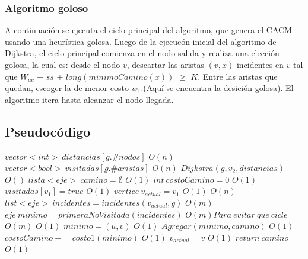 \subsubsection{Algoritmo goloso}

A continuaci\'on se ejecuta el ciclo principal del algoritmo, que genera el CACM usando una heur\'istica golosa. Luego de la ejecuc\'on inicial del algoritmo de Dijkstra, el ciclo principal comienza en el nodo salida y realiza una elecci\'on golosa, la cual es: desde el nodo $v$, descartar las aristas $(v,x)$ incidentes en $v$ tal que $W_{ac}$ + $ss$ + $long(minimoCamino(x))$ $\geq$ $K$. Entre las aristas que quedan, escoger la de menor costo $w_1$.(Aqu\'i se encuentra la desici\'on golosa). El algoritmo itera hasta alcanzar el nodo llegada.

\subsection{Pseudoc\'odigo}


\begin{algorithmic}


\State $vector<int> \: distancias[g.\#nodos]$
\Comment $ O(n) $
\State $vector<bool> \: visitadas[g.\#aristas]$
\Comment $ O(n) $
\State $ Dijkstra( g, v_2, distancias) $
\Comment $ O() $
\State $lista<eje> \: camino= \emptyset$
\Comment $ O(1) $
\State $ int \: costoCamino = 0 $
\Comment $ O(1) $
\State $ visitadas[v_1] = true $
\Comment $ O(1) $
\State $ vertice \: v_{actual} = v_1 $
\Comment $ O(1) $
\Comment $ O(n) $
	\State $ list<eje> \: incidentes = incidentes(v_{actual}, g) $
	\Comment $ O(m) $
	\State $ eje \:	 minimo = primeraNoVisitada(incidentes) $
	\Comment $ O(m) Para\: evitar \:que \:cicle $
	\Comment $ O(m) $
		\Comment $ O(1) $
			\State $ minimo = (u,v) $
			\Comment $ O(1) $
		\EndIf
	\EndFor
	\State $ Agregar(minimo, camino) $
	\Comment $ O(1) $
	\State $ costoCamino \: += costo1(minimo) $
	\Comment $ O(1) $
	\State $ v_{actual} = v $
	\Comment $ O(1) $
\EndWhile
\State $ return \: camino $
\Comment $ O(1) $

\EndProcedure

\end{algorithmic}
